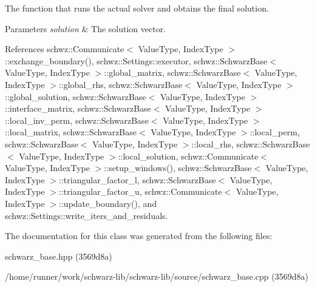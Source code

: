 The function that runs the actual solver and obtains the final solution. 


\begin{DoxyParams}{Parameters}
{\em solution} & The solution vector. \\
\hline
\end{DoxyParams}


References schwz\+::\+Communicate$<$ Value\+Type, Index\+Type $>$\+::exchange\+\_\+boundary(), schwz\+::\+Settings\+::executor, schwz\+::\+Schwarz\+Base$<$ Value\+Type, Index\+Type $>$\+::global\+\_\+matrix, schwz\+::\+Schwarz\+Base$<$ Value\+Type, Index\+Type $>$\+::global\+\_\+rhs, schwz\+::\+Schwarz\+Base$<$ Value\+Type, Index\+Type $>$\+::global\+\_\+solution, schwz\+::\+Schwarz\+Base$<$ Value\+Type, Index\+Type $>$\+::interface\+\_\+matrix, schwz\+::\+Schwarz\+Base$<$ Value\+Type, Index\+Type $>$\+::local\+\_\+inv\+\_\+perm, schwz\+::\+Schwarz\+Base$<$ Value\+Type, Index\+Type $>$\+::local\+\_\+matrix, schwz\+::\+Schwarz\+Base$<$ Value\+Type, Index\+Type $>$\+::local\+\_\+perm, schwz\+::\+Schwarz\+Base$<$ Value\+Type, Index\+Type $>$\+::local\+\_\+rhs, schwz\+::\+Schwarz\+Base$<$ Value\+Type, Index\+Type $>$\+::local\+\_\+solution, schwz\+::\+Communicate$<$ Value\+Type, Index\+Type $>$\+::setup\+\_\+windows(), schwz\+::\+Schwarz\+Base$<$ Value\+Type, Index\+Type $>$\+::triangular\+\_\+factor\+\_\+l, schwz\+::\+Schwarz\+Base$<$ Value\+Type, Index\+Type $>$\+::triangular\+\_\+factor\+\_\+u, schwz\+::\+Communicate$<$ Value\+Type, Index\+Type $>$\+::update\+\_\+boundary(), and schwz\+::\+Settings\+::write\+\_\+iters\+\_\+and\+\_\+residuals.



The documentation for this class was generated from the following files\+:\begin{DoxyCompactItemize}
\item 
schwarz\+\_\+base.\+hpp (3569d8a)\item 
/home/runner/work/schwarz-\/lib/schwarz-\/lib/source/schwarz\+\_\+base.\+cpp (3569d8a)\end{DoxyCompactItemize}
